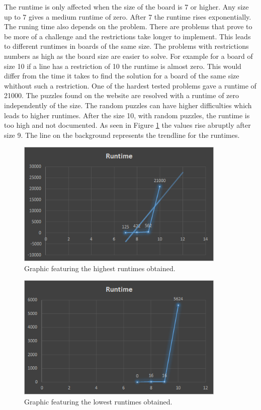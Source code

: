 \documentclass[runningheads,a4paper]{llncs}
\begin{document}
	The runtime is only affected when the size of the board is 7 or higher. Any size up to 7 gives a medium runtime of zero. After 7 the runtime rises exponentially. The runing time also depends on the problem. There are problems that prove to be more of a challenge and the restrictions take longer to implement. This leads to different runtimes in boards of the same size. The problems with restrictions numbers as high as the board size are easier to solve. For example for a board of size 10 if a line has a restriction of 10 the runtime is almost zero. This would differ from the time it takes to find the solution for a board of the same size whithout such a restriction. One of the hardest tested problems gave a runtime of 21000. The puzzles found on the website are resolved with a runtime of zero independently of the size. The random puzzles can have higher difficulties which leads to higher runtimes. After the size 10, with random puzzles, the runtime is too high and not documented. As seen in Figure \ref{runtimeHigh} the values rise abruptly after size 9. The line on the background represents the trendline for the runtimes. 

	\begin{figure}[h!]
	\centering
	\includegraphics[height=6.0cm]{runtimeHigh.png}
	\caption{Graphic featuring the highest runtimes obtained.}
	\label{runtimeHigh}
	\end{figure}


	\begin{figure}[h!]
	\centering
	\includegraphics[height=6.0cm]{runtimeBest.png}
	\caption{Graphic featuring the lowest runtimes obtained.}
	\label{runtimeBest}
	\end{figure}
\end{document}
